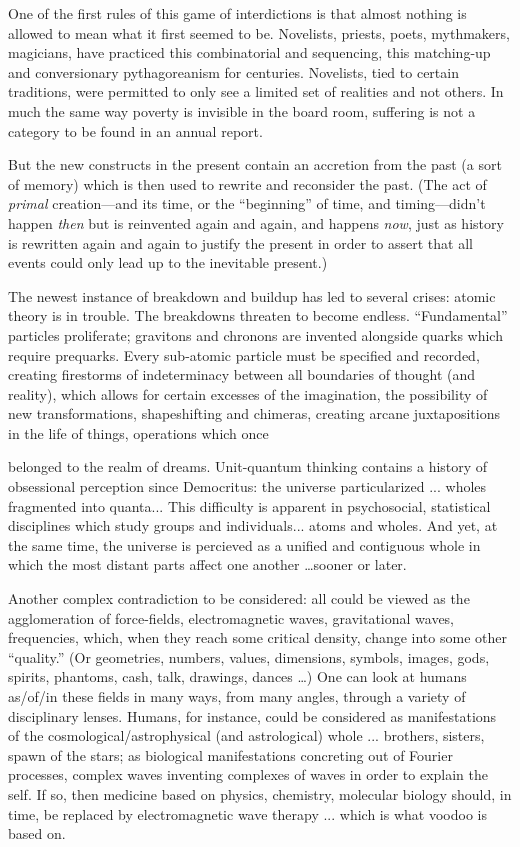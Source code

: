 One of the first rules of this game of
interdictions is that almost nothing is allowed to mean what it first seemed to be.
Novelists, priests, poets, mythmakers, magicians, have practiced this combinatorial and
sequencing, this matching-up and conversionary pythagoreanism for centuries. Novelists, tied to certain traditions, were permitted
to only see a limited set of realities and not
others. In much the same way poverty is
invisible in the board room, suffering is not a
category to be found in an annual report.

But the new constructs in the present
contain an accretion from the past (a sort of
memory) which is then used to rewrite and
reconsider the past. (The act of \emph{primal} creation---and its time, or the \enquote{beginning} of
time, and timing---didn't happen \emph{then} but is
reinvented again and again, and happens \emph{now}, just as history is rewritten again and
again to justify the present in order to assert that all events could only lead up to the
inevitable present.)

The newest instance of breakdown and
buildup has led to several crises: atomic
theory is in trouble. The breakdowns threaten
to become endless. \enquote{Fundamental} particles
proliferate; gravitons and chronons are invented 
alongside quarks which require prequarks. Every sub-atomic particle must be
specified and recorded, creating firestorms of indeterminacy between all boundaries of
thought (and reality), which allows for certain 
excesses of the imagination, the possibility of new transformations, shapeshifting
and chimeras, creating arcane juxtapositions
in the life of things, operations which once

belonged to the realm of dreams. Unit-quantum thinking contains a history of obsessional perception since Democritus: the universe particularized ... wholes fragmented
into quanta... This difficulty is apparent in psychosocial, statistical disciplines which
study groups and individuals... atoms and wholes. And yet, at the same time, the 
universe is percieved as a unified and contiguous whole in which the most distant parts
affect one another \ldots sooner or later.

Another complex contradiction to be considered: all could be viewed as the agglomeration of force-fields, electromagnetic waves, gravitational waves, frequencies, which,
when they reach some critical density, change into some other \enquote{quality.} (Or geometries,
numbers, values, dimensions, symbols, images, gods, spirits, phantoms, cash, talk,
drawings, dances \ldots ) One can look at humans as\slash of\slash in these fields in many ways,
from many angles, through a variety of disciplinary lenses. Humans, for instance, could
be considered as manifestations of the cosmological/astrophysical (and astrological)
whole ... brothers, sisters, spawn of the stars;
as biological manifestations concreting out of Fourier processes, complex waves
inventing complexes of waves in order to explain the self. If so, then medicine based
on physics, chemistry, molecular biology
should, in time, be replaced by electromagnetic wave therapy ... which is what voodoo is based on.

